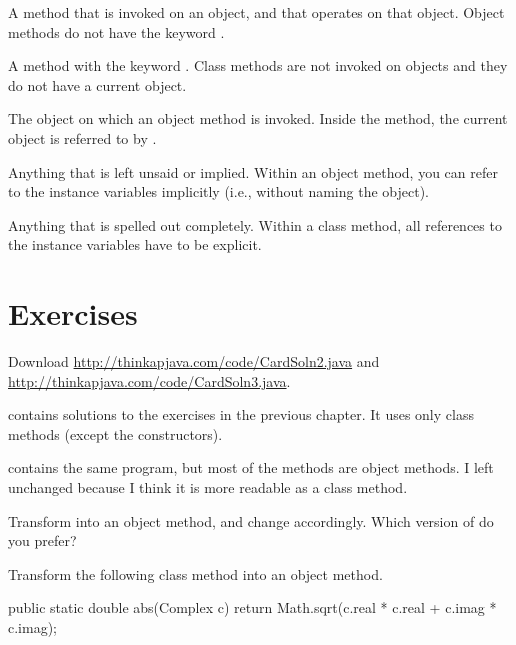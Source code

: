 \begin{description}

A method that is invoked on an object, and that operates on that object.
Object methods do not have the keyword .

A method with the keyword .
Class methods are not invoked on objects and they do not have a current object.

The object on which an object method is invoked.
Inside the method, the current object is referred to by .


Anything that is left unsaid or implied.
Within an object method, you can refer to the instance variables implicitly (i.e., without naming the object).

Anything that is spelled out completely.
Within a class method, all references to the instance variables have to be explicit.

\end{description}


\section{Exercises}


\begin{exercise}

Download \url{http://thinkapjava.com/code/CardSoln2.java} and \url{http://thinkapjava.com/code/CardSoln3.java}.

 contains solutions to the exercises in the previous chapter.
It uses only class methods (except the constructors).

 contains the same program, but most of the methods are object methods.
I left  unchanged because I think it is more readable as a class method.

Transform  into an object method, and change  accordingly.
Which version of  do you prefer?

\end{exercise}


\begin{exercise}

Transform the following class method into an object method.

\begin{code}
public static double abs(Complex c) {
    return Math.sqrt(c.real * c.real + c.imag * c.imag);
}
\end{code}
\end{exercise}


